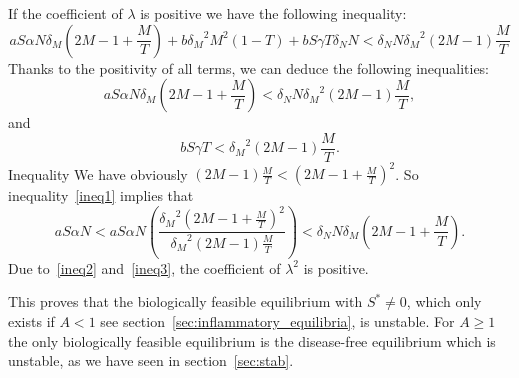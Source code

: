 \documentclass[a4paper, 12pt]{article}
\providecommand{\DIFaddtex}[1]{{\protect\color{blue} \sf #1}} %
\providecommand{\DIFdeltex}[1]{{\protect\color{red} \scriptsize #1}} %
\providecommand{\DIFaddbegin}{} %
\providecommand{\DIFaddend}{} %
\providecommand{\DIFdelbegin}{} %
\providecommand{\DIFdelend}{} %
\providecommand{\DIFadd}[1]{\texorpdfstring{\DIFaddtex{#1}}{#1}} %
\providecommand{\DIFdel}[1]{\texorpdfstring{\DIFdeltex{#1}}{}} %
\begin{document}
\noindent
If the coefficient of $\lambda$ is positive we have the following inequality:
\[
 a S \alpha N \delta_M (2M-1+\frac{M}{T})+ b{\delta_M}^2 M^2(1-T)+ b S\gamma T\delta_N N < \delta_N N {\delta_M}^2(2M-1)\frac{M}{T}
\]
Thanks to the positivity of all terms, we can deduce the following inequalities:
\begin{equation}
 a S \alpha N \delta_M (2M-1+\frac{M}{T}) < \delta_N N {\delta_M}^2(2M-1)\frac{M}{T},
\label{ineq1}
\end{equation}
and
\begin{equation}
 b S\gamma T < {\delta_M}^2(2M-1)\frac{M}{T}.
\label{ineq2}
\end{equation}
\DIFdelbegin \DIFdel{Inequality}\DIFdelend \DIFaddbegin \DIFadd{We have obviously $(2M-1)\frac{M}{T} < (2M-1 + \frac{M}{T})^2$. So inequality}\DIFaddend ~\eqref{ineq1} implies that 
\begin{equation}\label{ineq3}
a S \alpha N < a S \alpha N\left(\frac{{\delta_M}^2 {(2M-1+\frac{M}{T}) }^2}{{\delta_M}^2(2M-1)\frac{M}{T}}\right)<\delta_N N \delta_M (2M-1+\frac{M}{T}).
\end{equation}
Due to~\eqref{ineq2} and~\eqref{ineq3}, the coefficient of $\lambda^2$ is positive.
\par\noindent
This proves that \DIFaddbegin \DIFadd{the }\DIFaddend biologically feasible equilibrium with $S^* \neq 0$, which only exists if $A<1$ see section~\ref{sec:inflammatory_equilibria},  is unstable.
For $A\geq 1$ the only biologically feasible equilibrium is the disease-free equilibrium which is unstable, as we have seen in section~\ref{sec:stab}.
\end{document}
